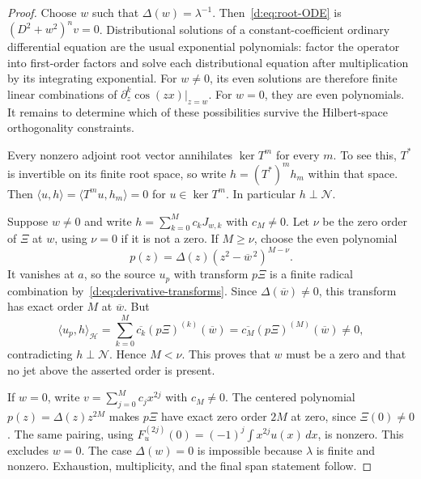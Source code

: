 \documentclass[11pt,a4paper]{article}
\numberwithin{equation}{section}
\theoremstyle{definition}\newtheorem{definition}[theorem]{Definition}
\theoremstyle{remark}\newtheorem{remark}[theorem]{Remark}
\newcommand{\Hh}{\mathcal H}\newcommand{\Hw}{\mathcal H}
\newcommand{\ip}[2]{\langle#1,#2\rangle}\newcommand{\norm}[1]{\lVert#1\rVert}\newcommand{\abs}[1]{\lvert#1\rvert}
\newcommand{\Nn}{\mathcal N}\newcommand{\Ii}{\mathcal I}\newcommand{\Zz}{\mathcal Z}
\begin{document}
\begin{proof}
Choose $w$ such that $\Delta(w)=\lambda^{-1}$. Then~\eqref{d:eq:root-ODE} is $(D^2+w^2)^nv=0$. Distributional solutions of a constant-coefficient ordinary differential equation are the usual exponential polynomials: factor the operator into first-order factors and solve each distributional equation after multiplication by its integrating exponential. For $w\ne0$, its even solutions are therefore finite linear combinations of $\partial_z^k\cos(zx)|_{z=w}$. For $w=0$, they are even polynomials. It remains to determine which of these possibilities survive the Hilbert-space orthogonality constraints.

Every nonzero adjoint root vector annihilates $\ker T^m$ for every $m$. To see this, $T^*$ is invertible on its finite root space, so write $h=(T^*)^mh_m$ within that space. Then $\ip{u}{h}=\ip{T^mu}{h_m}=0$ for $u\in\ker T^m$. In particular $h\perp\Nn$.

Suppose $w\ne0$ and write $h=\sum_{k=0}^M c_kJ_{w,k}$ with $c_M\ne0$. Let $\nu$ be the zero order of $\Xi$ at $w$, using $\nu=0$ if it is not a zero. If $M\ge\nu$, choose the even polynomial
\[
 p(z)=\Delta(z)(z^2-\overline{w}^{\,2})^{M-\nu}.
\]
It vanishes at $a$, so the source $u_p$ with transform $p\Xi$ is a finite radical combination by~\eqref{d:eq:derivative-transforms}. Since $\Delta(\overline w)\ne0$, this transform has exact order $M$ at $\overline w$. But
\[
 \ip{u_p}{h}_{\Hh}
 =\sum_{k=0}^M\overline{c_k}(p\Xi)^{(k)}(\overline w)
 =\overline{c_M}(p\Xi)^{(M)}(\overline w)\ne0,
\]
contradicting $h\perp\Nn$. Hence $M<\nu$. This proves that $w$ must be a zero and that no jet above the asserted order is present.

If $w=0$, write $v=\sum_{j=0}^M c_jx^{2j}$ with $c_M\ne0$. The centered polynomial $p(z)=\Delta(z)z^{2M}$ makes $p\Xi$ have exact zero order $2M$ at zero, since $\Xi(0)\ne0$. The same pairing, using $F_u^{(2j)}(0)=(-1)^j\int x^{2j}u(x)\,dx$, is nonzero. This excludes $w=0$. The case $\Delta(w)=0$ is impossible because $\lambda$ is finite and nonzero. Exhaustion, multiplicity, and the final span statement follow.
\end{proof}
\end{document}
